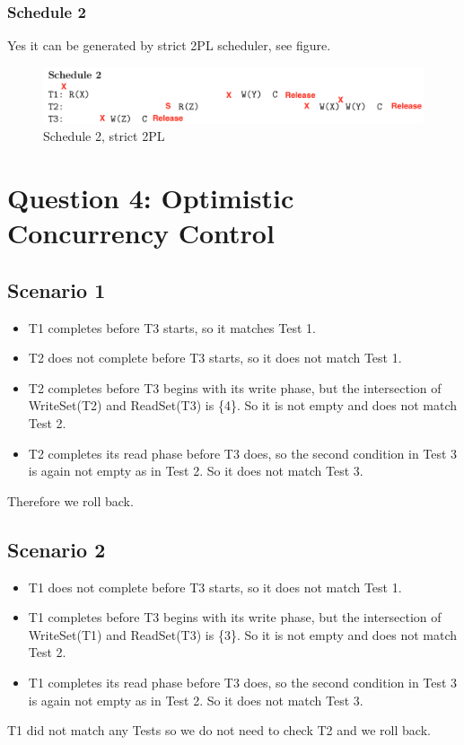\documentclass[12pt,a4paper]{article}
\begin{document}
\subsubsection{Schedule 2}
Yes it can be generated by strict 2PL scheduler, see figure.
\begin{figure}[!htb]
	\center
	\includegraphics[width=\textwidth]{img/Schedule2_strict2PL}
	\caption{Schedule 2, strict 2PL}
\end{figure}

\section{Question 4: Optimistic Concurrency Control}
\subsection{Scenario 1}
\begin{itemize}
\item T1 completes before T3 starts, so it matches Test 1.
\item T2 does not complete before T3 starts, so it does not match Test 1.
\item T2 completes before T3 begins with its write phase, but the intersection of WriteSet(T2) and ReadSet(T3) is \{4\}. So it is not empty and does not match Test 2.
\item T2 completes its read phase before T3 does, so the second condition in Test 3 is again not empty as in Test 2. So it does not match Test 3.
\end{itemize}
Therefore we roll back.
\subsection{Scenario 2}
\begin{itemize}
\item T1 does not complete before T3 starts, so it does not match Test 1.
\item T1 completes before T3 begins with its write phase, but the intersection of WriteSet(T1) and ReadSet(T3) is \{3\}. So it is not empty and does not match Test 2.
\item T1 completes its read phase before T3 does, so the second condition in Test 3 is again not empty as in Test 2. So it does not match Test 3.
\end{itemize}
T1 did not match any Tests so we do not need to check T2 and we roll back.
\end{document}
